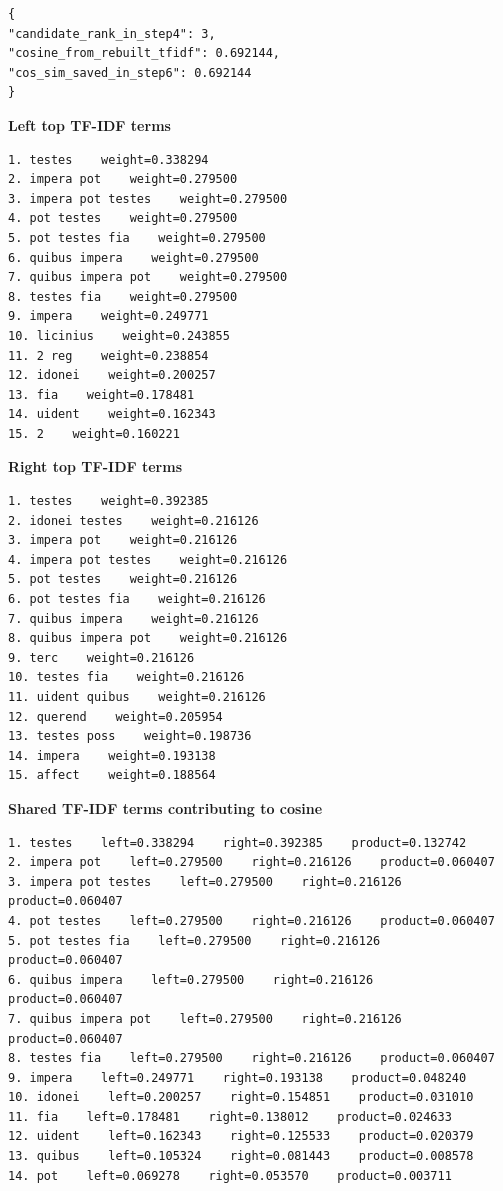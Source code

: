 \begin{lstlisting}[breaklines=true,basicstyle=\ttfamily\small,language={}]
{
"candidate_rank_in_step4": 3,
"cosine_from_rebuilt_tfidf": 0.692144,
"cos_sim_saved_in_step6": 0.692144
}
\end{lstlisting}

\textbf{Left top TF-IDF terms} 

\begin{lstlisting}[breaklines=true,basicstyle=\ttfamily\small]
1. testes    weight=0.338294
2. impera pot    weight=0.279500
3. impera pot testes    weight=0.279500
4. pot testes    weight=0.279500
5. pot testes fia    weight=0.279500
6. quibus impera    weight=0.279500
7. quibus impera pot    weight=0.279500
8. testes fia    weight=0.279500
9. impera    weight=0.249771
10. licinius    weight=0.243855
11. 2 reg    weight=0.238854
12. idonei    weight=0.200257
13. fia    weight=0.178481
14. uident    weight=0.162343
15. 2    weight=0.160221
\end{lstlisting}

\textbf{Right top TF-IDF terms} 

\begin{lstlisting}[breaklines=true,basicstyle=\ttfamily\small]
1. testes    weight=0.392385
2. idonei testes    weight=0.216126
3. impera pot    weight=0.216126
4. impera pot testes    weight=0.216126
5. pot testes    weight=0.216126
6. pot testes fia    weight=0.216126
7. quibus impera    weight=0.216126
8. quibus impera pot    weight=0.216126
9. terc    weight=0.216126
10. testes fia    weight=0.216126
11. uident quibus    weight=0.216126
12. querend    weight=0.205954
13. testes poss    weight=0.198736
14. impera    weight=0.193138
15. affect    weight=0.188564
\end{lstlisting}

\textbf{Shared TF-IDF terms contributing to cosine} 

\begin{lstlisting}[breaklines=true,basicstyle=\ttfamily\small]
1. testes    left=0.338294    right=0.392385    product=0.132742
2. impera pot    left=0.279500    right=0.216126    product=0.060407
3. impera pot testes    left=0.279500    right=0.216126    product=0.060407
4. pot testes    left=0.279500    right=0.216126    product=0.060407
5. pot testes fia    left=0.279500    right=0.216126    product=0.060407
6. quibus impera    left=0.279500    right=0.216126    product=0.060407
7. quibus impera pot    left=0.279500    right=0.216126    product=0.060407
8. testes fia    left=0.279500    right=0.216126    product=0.060407
9. impera    left=0.249771    right=0.193138    product=0.048240
10. idonei    left=0.200257    right=0.154851    product=0.031010
11. fia    left=0.178481    right=0.138012    product=0.024633
12. uident    left=0.162343    right=0.125533    product=0.020379
13. quibus    left=0.105324    right=0.081443    product=0.008578
14. pot    left=0.069278    right=0.053570    product=0.003711
\end{lstlisting}

